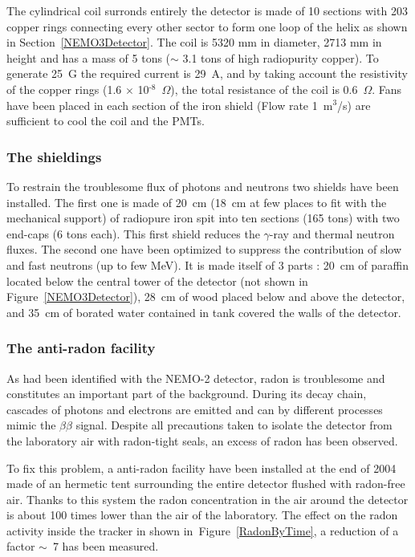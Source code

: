 \documentclass[main.tex]{subfiles}
\begin{document}
\bigskip


\NI The cylindrical coil surronds entirely the detector is made of 10 sections with 203 copper rings connecting every other sector to form one loop of the helix as shown in Section~\ref{NEMO3Detector}. The coil is 5320 mm in diameter, 2713 mm in height and has a mass of 5 tons ($\sim$ 3.1 tons of high radiopurity copper). To generate 25~G the required current is 29~A, and by taking account the resistivity of the copper rings (1.6 $\times$ 10$^{\text{-8}}$~$\Omega$), the total resistance of the coil is 0.6~$\Omega$. Fans have been placed in each section of the iron shield (Flow rate 1~m$^\text{3}$/s) are sufficient to cool the coil and the PMTs.



\subsubsection{The shieldings}


\NI To restrain the troublesome flux of photons and neutrons two shields have been installed. The first one is made of 20~cm (18~cm at few places to fit with the mechanical support) of radiopure iron spit into ten sections (165 tons) with two end-caps (6 tons each). This first shield reduces the $\gamma$-ray and thermal neutron fluxes. The second one have been optimized to suppress the contribution of slow and fast neutrons (up to few MeV). It is made itself of 3 parts :  20~cm of paraffin located below the central tower of the detector (not shown in Figure~\ref{NEMO3Detector}), 28~cm of wood placed below and above the detector, and 35~cm of borated water contained in tank covered the walls of the detector.  


\subsubsection{The anti-radon facility}


\NI As had been identified with the NEMO-2 detector, radon is troublesome and constitutes an important part of the background. During its decay chain, cascades of photons and electrons are emitted and can by different processes mimic the $\beta\beta$ signal. Despite all precautions taken to isolate the detector from the laboratory air with radon-tight seals, an excess of radon has been observed.  


\bigskip


\NI To fix this problem, a anti-radon facility have been installed at the end of 2004 made of an hermetic tent surrounding the entire detector flushed with radon-free air. Thanks to this system the radon concentration in the air around the detector is about 100 times lower than the air of the laboratory. The effect on the radon activity inside the tracker in shown in~Figure~\ref{RadonByTime}, a reduction of a factor $\sim$~7 has been measured.
\end{document}
